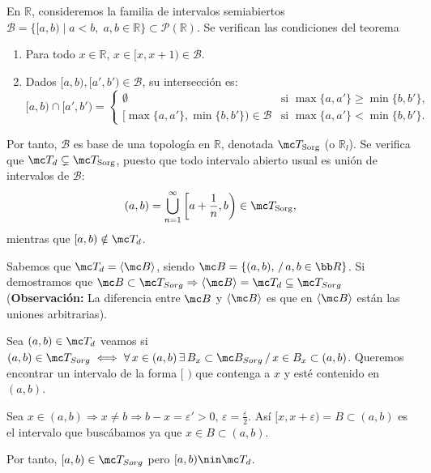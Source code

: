 \begin{ejer}
En \(\mathbb{R}\), consideremos la familia de intervalos semiabiertos \(\mathcal{B} = \{[a, b) \mid a < b, \; a, b \in \mathbb{R}\} \subset \mathcal{P}(\mathbb{R})\). Se verifican las condiciones del teorema
\begin{enumerate}
    \item[\textbf{1)}] Para todo \(x \in \mathbb{R}\), \(x \in [x, x+1) \in \mathcal{B}\).
    \item[\textbf{2)}] Dados \([a, b), [a', b') \in \mathcal{B}\), su intersección es:
    \[
        [a, b) \cap [a', b') = \begin{cases} \emptyset & \text{si } \max\{a, a'\} \ge \min\{b, b'\}, \\ [\max\{a, a'\}, \min\{b, b'\}) \in \mathcal{B} & \text{si } \max\{a, a'\} < \min\{b, b'\}. \end{cases} \text{}
    \]
\end{enumerate}
Por tanto, \(\mathcal{B}\) es base de una topología en \(\mathbb{R}\), denotada \(\mc T_{\text{Sorg}}\) (o \(\mathbb{R}_l\)). Se verifica que \(\mc T_d \subsetneq \mc T_{\text{Sorg}}\), puesto que todo intervalo abierto usual es unión de intervalos de \(\mathcal{B}\):
\[
    (a, b) = \bigcup_{n=1}^\infty \left[a + \frac{1}{n}, b\right) \in \mc T_{\text{Sorg}} \text{},
\]
mientras que \([a, b) \notin \mc T_d\).
\end{ejer}
Sabemos que $\mc T_d=\langle \mc B \rangle$, siendo $\mc B=\{(a,b), \, / \,  a,b \in \bb R\}$. Si demostramos que $\mc B \subset \mc T_{Sorg}\Rightarrow \langle \mc B \rangle=\mc T_d \subseteq \mc T_{Sorg}$ (\textbf{Observaci\'on:} La diferencia entre $\mc B$ y $\langle \mc B \rangle$ es que en $\langle \mc B \rangle$ est\'an las uniones arbitrarias). 

Sea $(a,b)\in \mc T_d$ veamos si $(a,b)\in \mc T_{Sorg} \iff \forall \, x\in (a,b) \, \exists \, B_x\subset \mc B_{Sorg}\, / \, x\in B_x \subset(a,b)$. Queremos encontrar un intervalo de la forma $[\,\,)$ que contenga a $x$ y est\'e contenido en $(a,b)$. 

Sea $x\in (a,b) \Rightarrow x\neq b \Rightarrow b-x = \varepsilon'>0, \, \varepsilon = \frac{\varepsilon}{2}$. As\'i $[x,x+\varepsilon)=B\subset (a,b)$ es el intervalo que busc\'abamos ya que $x\in B \subset(a,b)$. 

Por tanto, $[a,b) \in \mc T_{Sorg}$ pero $[a,b)\nin \mc T_d$.

